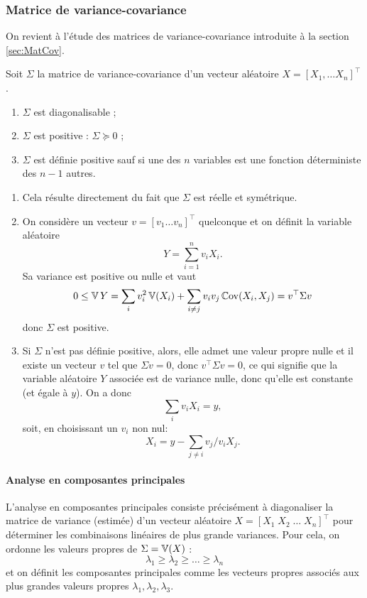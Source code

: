 \subsubsection{Matrice de variance-covariance}

On revient à l'étude des matrices de variance-covariance introduite à la section \ref{sec:MatCov}.

\begin{proposition}
  Soit $\Sigma$ la matrice de variance-covariance d'un vecteur aléatoire $X = [X_1, \dots X_n]^\top$.
  \begin{enumerate}
    \item $\Sigma$ est diagonalisable ;
    \item $\Sigma$ est positive : $\Sigma \succcurlyeq 0$ ;
    \item $\Sigma$ est définie positive sauf si une des $n$ variables est une fonction déterministe des $n-1$ autres.
  \end{enumerate}
\end{proposition}

\proof
\begin{enumerate}
\item Cela résulte directement du fait que $\Sigma$ est réelle et symétrique.
\item On considère un vecteur $v = [v_1 \dots v_n]^\top$ quelconque et on définit la variable aléatoire 
$$
Y = \sum_{i=1}^n v_i X_i.
$$
Sa variance est positive ou nulle et vaut
$$
0 \leq \operatorname{\mathbb{V}} Y 
= \sum_i v_i^2 \operatorname{\mathbb{V}}(X_i) + \sum_{i \neq j} v_i v_j \operatorname{\mathbb{C}ov}(X_i, X_j)
= v^\top \Sigma v
$$
donc $\Sigma$ est positive.
\item Si $\Sigma$  n'est pas définie positive, alors, elle admet une valeur propre nulle et il existe un vecteur $v$ tel que $\Sigma v = 0$, donc $v^\top \Sigma v = 0$, ce qui signifie que la variable aléatoire $Y$ associée est de variance nulle, donc qu'elle est constante (et égale à $y$). On a donc
$$
\sum_i v_i X_i = y,
$$
soit, en choisissant un $v_i$ non nul: 
$$
X_i = y - \sum_{j \neq i} v_j/v_i X_j.
$$
\end{enumerate}
\eproof

\paragraph*{Analyse en composantes principales} 
L'analyse en composantes principales consiste précisément à diagonaliser la matrice de variance (estimée) d'un vecteur aléatoire $X = [X_1 \; X_2 \; \dots \; X_n]^\top$ pour déterminer les combinaisons linéaires de plus grande variances. Pour cela, on ordonne les valeurs propres de $\Sigma = \operatorname{\mathbb{V}}(X)$ : 
$$
\lambda_1 \geq \lambda_2 \geq \dots \geq \lambda_n
$$
et on définit les composantes principales comme les vecteurs propres associés aux plus grandes valeurs propres $\lambda_1, \lambda_2, \lambda_3$.

